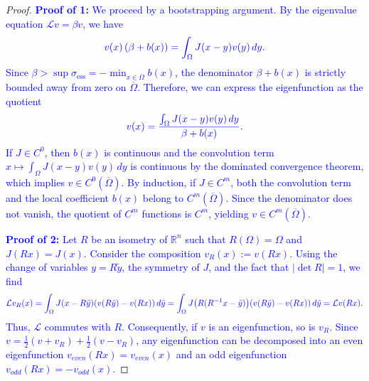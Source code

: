 \documentclass[12pt, a4paper]{article}
\newcommand{\revision}[1]{\textcolor{blue}{#1}}
\theoremstyle{break}
\theoremstyle{break}
\theoremstyle{break}
\theoremstyle{break}
\theoremstyle{break}
\theoremstyle{break}
\theoremstyle{break}
\theoremstyle{break}
\theoremstyle{break}
\begin{document}
\begin{proof}
    \revision{\textbf{Proof of 1:} We proceed by a bootstrapping argument. By the eigenvalue equation $\mathcal{L}v = \beta v$, we have}
    \begin{equation}
        \revision{v(x) \left( \beta + b(x) \right) = \int_\Omega J(x-y)v(y)\,dy.}
    \end{equation}
    \revision{Since $\beta > \sup \sigma_{\mathrm{ess}} = -\min_{x \in \overline{\Omega}} b(x)$, the denominator $\beta + b(x)$ is strictly bounded away from zero on $\overline{\Omega}$. Therefore, we can express the eigenfunction as the quotient}
    \begin{equation}
        \revision{v(x) = \frac{\int_\Omega J(x-y)v(y)\,dy}{\beta + b(x)}.}
    \end{equation}
    \revision{If $J \in C^0$, then $b(x)$ is continuous and the convolution term $x \mapsto \int_\Omega J(x-y)v(y)\,dy$ is continuous by the dominated convergence theorem, which implies $v \in C^0(\overline{\Omega})$. By induction, if $J \in C^m$, both the convolution term and the local coefficient $b(x)$ belong to $C^m(\overline{\Omega})$. Since the denominator does not vanish, the quotient of $C^m$ functions is $C^m$, yielding $v \in C^m(\overline{\Omega})$.}
    
    \revision{\textbf{Proof of 2:} Let $R$ be an isometry of $\mathbb{R}^n$ such that $R(\Omega) = \Omega$ and $J(Rx) = J(x)$. Consider the composition $v_R(x) := v(Rx)$. Using the change of variables $y = R\tilde{y}$, the symmetry of $J$, and the fact that $|\det R| = 1$, we find}
    \begin{equation}
        \revision{\mathcal{L}v_R(x) = \int_\Omega J(x-R\tilde{y})(v(R\tilde{y})-v(Rx)) \, d\tilde{y} = \int_\Omega J\big(R(R^{-1}x-\tilde{y})\big)(v(R\tilde{y})-v(Rx)) \, d\tilde{y} = \mathcal{L}v(Rx).}
    \end{equation}
    \revision{Thus, $\mathcal{L}$ commutes with $R$. Consequently, if $v$ is an eigenfunction, so is $v_R$. Since $v = \frac{1}{2}(v + v_R) + \frac{1}{2}(v - v_R)$, any eigenfunction can be decomposed into an even eigenfunction $v_{even}(Rx) = v_{even}(x)$ and an odd eigenfunction $v_{odd}(Rx) = -v_{odd}(x)$.}
\end{proof}
\end{document}
